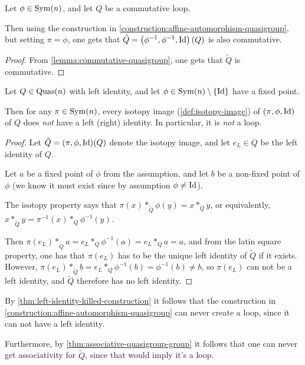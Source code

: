 \begin{corollary} \label{corollary:construction-symmetric}
    Let \( \phi \in \operatorname{Sym}(n) \), and let \( Q \) be a commutative loop.

    Then using the construction in \autoref{construction:affine-automorphism-quasigroup}, but setting \( \pi = \phi \), one gets that \( \tilde{Q} = \left( \phi^{-1}, \phi^{-1}, \operatorname{Id} \right)(Q) \) is also commutative.
\end{corollary}
\begin{proof}
    From \autoref{lemma:commutative-quasigroup}, one gets that \( \tilde{Q} \) is commutative.
\end{proof}

\begin{theorem} \label{thm:left-identity-killed-construction}
    Let \( Q \in \operatorname{Quas}(n) \) with left identity, and let \( \phi \in \operatorname{Sym}(n) \setminus \{\operatorname{Id}\} \) have a fixed point.

    Then for any \( \pi \in \operatorname{Sym}(n) \), every isotopy image (\autoref{def:isotopy-image}) of \( (\pi, \phi, \operatorname{Id}) \) of \( Q \) does \emph{not} have a left (right) identity. In particular, it is \emph{not} a loop.
\end{theorem}
\begin{proof}
    Let \( \tilde{Q} = (\pi, \phi, \operatorname{Id})(Q) \) denote the isotopy image, and let \( e_L \in Q \) be the left identity of \( Q \). 
    
    Let \( a \) be a fixed point of \( \phi \) from the assumption, and let \( b \) be a non-fixed point of \( \phi \) (we know it must exist since by assumption \( \phi \neq \operatorname{Id} \)).

    The isotopy property says that \( \pi(x) *_{\tilde{Q}} \phi(y) = x *_Q y \), or equivalently, \( x *_{\tilde{Q}} y = \pi^{-1}(x) *_Q \phi^{-1}(y) \).

    Then \( \pi(e_L) *_{\tilde{Q}} a = e_L *_Q \phi^{-1}(a) = e_L *_Q a = a \), and from the latin square property, one has that \( \pi(e_L) \) has to be the unique left identity of \( \tilde{Q} \) if it exists. However, \( \pi(e_L) *_{\tilde{Q}} b = e_L *_Q \phi^{-1}(b) = \phi^{-1}(b) \neq b \), so \( \pi(e_L) \) can not be a left identity, and \( \tilde{Q} \) therefore has no left identity.
\end{proof}

\begin{remark} \label{remark:left-identity-killed}
    By \autoref{thm:left-identity-killed-construction} it follows that the construction in \autoref{construction:affine-automorphism-quasigroup} can never create a loop, since it can not have a left identity.

    Furthermore, by \autoref{thm:associative-quasigroup-group} it follows that one can never get associativity for \( \tilde{Q} \), since that would imply it's a loop.
\end{remark}

